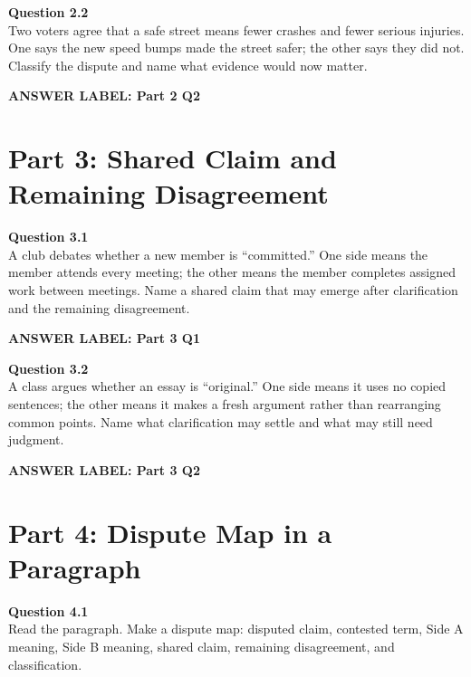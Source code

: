 \documentclass[12pt]{article}
\newcommand{\answerbox}[2]{%
\vspace{0.15em}
\noindent\textbf{#1}\par
\vspace{0.05em}
\noindent\fbox{%
\begin{minipage}[t][#2]{\dimexpr\textwidth-2\fboxsep-2\fboxrule}
\rule{\textwidth}{0pt}
\vspace{#2}
\end{minipage}
}\par
\vspace{0.25em}
}
\begin{document}
\textbf{Question 2.2}\\[-0.15em]
Two voters agree that a safe street means fewer crashes and fewer serious injuries. One says the new speed bumps made the street safer; the other says they did not. Classify the dispute and name what evidence would now matter.

\answerbox{ANSWER LABEL: Part 2 Q2}{2.45in}

\newpage

\section*{Part 3: Shared Claim and Remaining Disagreement}

\textbf{Question 3.1}\\[-0.15em]
A club debates whether a new member is ``committed.'' One side means the member attends every meeting; the other means the member completes assigned work between meetings. Name a shared claim that may emerge after clarification and the remaining disagreement.

\answerbox{ANSWER LABEL: Part 3 Q1}{2.55in}

\textbf{Question 3.2}\\[-0.15em]
A class argues whether an essay is ``original.'' One side means it uses no copied sentences; the other means it makes a fresh argument rather than rearranging common points. Name what clarification may settle and what may still need judgment.

\answerbox{ANSWER LABEL: Part 3 Q2}{2.55in}

\newpage

\section*{Part 4: Dispute Map in a Paragraph}

\textbf{Question 4.1}\\[-0.15em]
Read the paragraph. Make a dispute map: disputed claim, contested term, Side A meaning, Side B meaning, shared claim, remaining disagreement, and classification.

\vspace{0.2em}

\noindent{}
\end{document}
